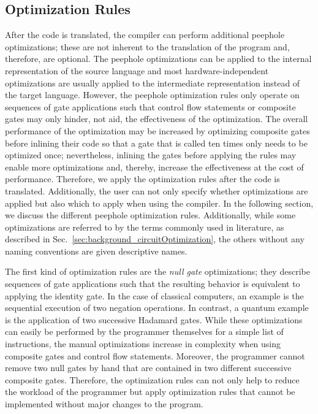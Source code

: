 \subsection{Optimization Rules}
After the code is translated, the compiler can perform additional peephole optimizations; these are not inherent to the translation of the program and, therefore, are optional. 
The peephole optimizations can be applied to the internal representation of the source language and most hardware-independent optimizations are usually applied to the intermediate representation instead of the target language. However, the peephole optimization rules only operate on sequences of gate applications such that control flow statements or composite gates may only hinder, not aid, the effectiveness of the optimization. The overall performance of the optimization may be increased by optimizing composite gates before inlining their code so that a gate that is called ten times only needs to be optimized once; nevertheless, inlining the gates before applying the rules may enable more optimizations and, thereby, increase the effectiveness at the cost of performance. Therefore, we apply the optimization rules after the code is translated.
Additionally, the user can not only specify whether optimizations are applied but also which to apply when using the compiler. In the following section, we discuss the different peephole optimization rules. 
Additionally, while some optimizations are referred to by the terms commonly used in literature, as described in Sec.~\ref{sec:background_circuitOptimization}, the others without any naming conventions are given descriptive names.

The first kind of optimization rules are the \emph{null gate} optimizations; they describe sequences of gate applications such that the resulting behavior is equivalent to applying the identity gate. In the case of classical computers, an example is the sequential execution of two negation operations. In contrast, a quantum example is the application of two successive Hadamard gates. While these optimizations can easily be performed by the programmer themselves for a simple list of instructions, the manual optimizations increase in complexity when using composite gates and control flow statements. Moreover, the programmer cannot remove two null gates by hand that are contained in two different successive composite gates. Therefore, the optimization rules can not only help to reduce the workload of the programmer but apply optimization rules that cannot be implemented without major changes to the program.

